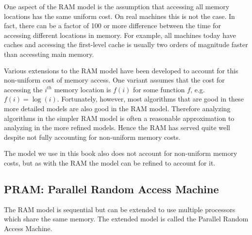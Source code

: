 \begin{cluster}
\label{grp:rmrk:analysis::models::aspect}

\begin{remark}
\label{rmrk:analysis::models::aspect}
One aspect of the RAM model is the assumption that
accessing all memory locations has the same uniform cost.  On real
machines this is not the case.  In fact, there can be a factor of 100
or more
difference between the time for accessing different locations in
memory.  For example, all machines today have caches and accessing the
first-level cache is usually two orders of magnitude faster than
accessting main memory.

Various extensions to the RAM model have been developed to account for
this non-uniform cost of memory access.  One variant assumes that the
cost for accessing the $i^{th}$ memory location is $f(i)$ for some
function $f$, e.g. $f(i) = \log(i)$.  
Fortunately, however, most algorithms that are good in these more
detailed models are also good in the RAM model.
Therefore analyzing algorithms in the simpler RAM model is often a
reasonable approximation to analyzing in the more refined models.
Hence the RAM has served quite well despite not fully accounting for
non-uniform memory costs.

The model we use in this book also does not account for non-uniform
memory costs, but as with the RAM the model can be refined to account
for it.

\end{remark}
\end{cluster}


\subsection{PRAM: Parallel Random Access Machine}
\label{sec:analysis::models::pram-parallel-random-access-machine}

\begin{cluster}
\label{grp:grm:analysis::models::model}

\begin{gram}
\label{grm:analysis::models::model}
The RAM model is sequential but can be extended to use multiple processors
which share the same memory.  The extended model is called the
Parallel Random Access Machine.

\end{gram}
\end{cluster}

